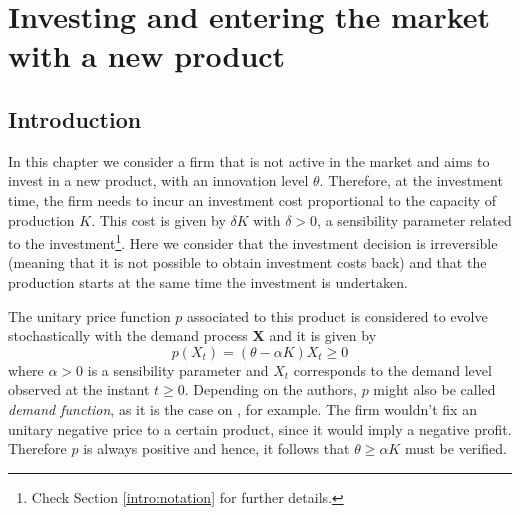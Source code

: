


\chapter{Investing and entering the market with a new product}
\label{chapter:1}



\section{Introduction}
\label{section:overview}

In this chapter we consider a firm that %
is not active in the market and aims to invest in a new product, with an innovation level $\theta$. Therefore, at the investment time, the firm needs to incur an investment cost proportional to the capacity of production $K$. This cost is given by $\delta K$ with $\delta>0$, a sensibility parameter related to the investment\footnote{Check Section \ref{intro:notation} for further details.}. Here we consider that the investment decision is irreversible (meaning that it is not possible to obtain investment costs back) and that the production starts at the same time the investment is undertaken.


The unitary price function $p$ associated to this product is considered to evolve stochastically with the demand process \textbf{X} and it is given by
\begin{equation}
p(X_t)=(\theta-\alpha K) X_t \geq 0
\label{prob1:p}
\end{equation}
where $\alpha>0$ is a sensibility parameter and $X_t$ corresponds to the demand level observed at the instant $t\geq0$. Depending on the authors, $p$ might also be called \textit{demand function}, as it is the case on \cite{rita}, for example. The firm wouldn't fix an unitary negative price to a certain product, since it would imply a negative profit. Therefore $p$ is always positive and hence, it follows that $\theta \geq \alpha K$ must be verified.


